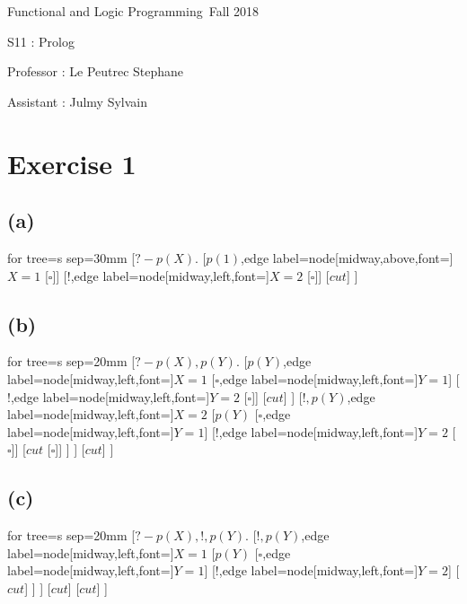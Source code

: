 \documentclass[a4paper,11pt]{report}
\author{Sylvain Julmy}
\date{\today}
\newcommand*{\equal}{=}
\newcommand*{\disj}{,}
\begin{document}
\begin{center}
  \Large{
    Functional and Logic Programming\
    Fall 2018
  }
  
  \noindent\makebox[\linewidth]{\rule{\linewidth}{0.4pt}}
  S11 : Prolog
  \noindent\makebox[\linewidth]{\rule{\linewidth}{0.4pt}}

  \begin{flushleft}
    Professor : Le Peutrec Stephane
    
    Assistant : Julmy Sylvain
  \end{flushleft}

  \noindent\makebox[\linewidth]{\rule{\textwidth}{1pt}}
\end{center}

\section*{Exercise 1}

\subsection*{(a)}
\begin{forest}
  for tree={s sep=30mm}
  [$?- p(X).$
  [$p(1)$,edge label={node[midway,above,font=\scriptsize]{$X \equal 1$}}
  [$\square$]]
  [$!$,edge label={node[midway,left,font=\scriptsize]{$X \equal 2$}}
  [$\square$]]
  [$cut$]
  ]
\end{forest}

\subsection*{(b)}
\begin{forest}
  for tree={s sep=20mm}
  [$?- p(X) \disj p(Y).$
  [$ p(Y) $,edge label={node[midway,left,font=\scriptsize]{$X \equal 1$}}
  [$\square$,edge label={node[midway,left,font=\scriptsize]{$Y \equal 1$}}]
  [$!$,edge label={node[midway,left,font=\scriptsize]{$Y \equal 2$}} [$\square$]]
  [$cut$]
  ]
  [$ ! \disj p(Y) $,edge label={node[midway,left,font=\scriptsize]{$X \equal2$}}
  [$p(Y)$
  [$\square$,edge label={node[midway,left,font=\scriptsize]{$Y \equal 1$}}]
  [$!$,edge label={node[midway,left,font=\scriptsize]{$Y \equal 2$}} [$\square$]]
  [$cut$
  [$\square$]]
  ]
  ]
  [$cut$]
  ]
\end{forest}

\subsection*{(c)}
\begin{forest}
  for tree={s sep=20mm}
  [$?- p(X) \disj ! \disj p(Y).$
  [$ ! \disj p(Y) $,edge label={node[midway,left,font=\scriptsize]{$X \equal 1$}}
  [$p(Y)$
  [$\square$,edge label={node[midway,left,font=\scriptsize]{$Y \equal 1$}}]
  [$!$,edge label={node[midway,left,font=\scriptsize]{$Y \equal 2$}}]
  [$cut$]
  ]
  ]
  [$cut$]
  [$cut$]
  ]
\end{forest}
\end{document}
